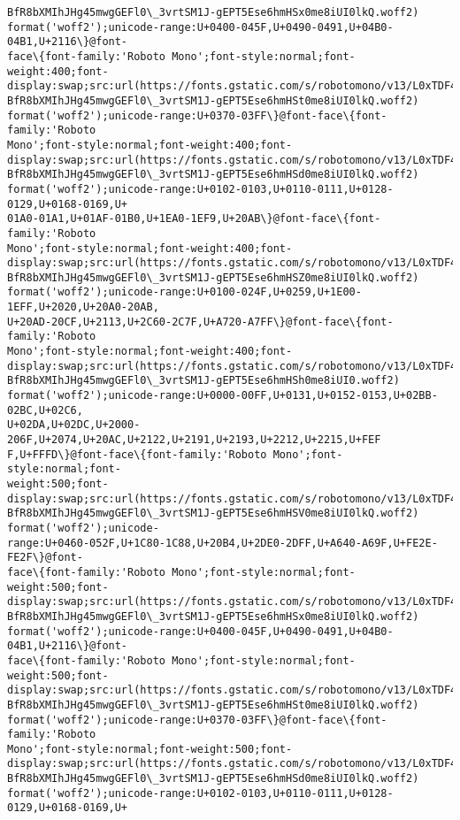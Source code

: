 \documentclass[11pt]{article}
\begin{document}
\begin{Verbatim}[commandchars=\\\{\}]
BfR8bXMIhJHg45mwgGEFl0\_3vrtSM1J-gEPT5Ese6hmHSx0me8iUI0lkQ.woff2)
format('woff2');unicode-range:U+0400-045F,U+0490-0491,U+04B0-04B1,U+2116\}@font-
face\{font-family:'Roboto Mono';font-style:normal;font-weight:400;font-
display:swap;src:url(https://fonts.gstatic.com/s/robotomono/v13/L0xTDF4xlVMF-
BfR8bXMIhJHg45mwgGEFl0\_3vrtSM1J-gEPT5Ese6hmHSt0me8iUI0lkQ.woff2)
format('woff2');unicode-range:U+0370-03FF\}@font-face\{font-family:'Roboto
Mono';font-style:normal;font-weight:400;font-
display:swap;src:url(https://fonts.gstatic.com/s/robotomono/v13/L0xTDF4xlVMF-
BfR8bXMIhJHg45mwgGEFl0\_3vrtSM1J-gEPT5Ese6hmHSd0me8iUI0lkQ.woff2)
format('woff2');unicode-range:U+0102-0103,U+0110-0111,U+0128-0129,U+0168-0169,U+
01A0-01A1,U+01AF-01B0,U+1EA0-1EF9,U+20AB\}@font-face\{font-family:'Roboto
Mono';font-style:normal;font-weight:400;font-
display:swap;src:url(https://fonts.gstatic.com/s/robotomono/v13/L0xTDF4xlVMF-
BfR8bXMIhJHg45mwgGEFl0\_3vrtSM1J-gEPT5Ese6hmHSZ0me8iUI0lkQ.woff2)
format('woff2');unicode-range:U+0100-024F,U+0259,U+1E00-1EFF,U+2020,U+20A0-20AB,
U+20AD-20CF,U+2113,U+2C60-2C7F,U+A720-A7FF\}@font-face\{font-family:'Roboto
Mono';font-style:normal;font-weight:400;font-
display:swap;src:url(https://fonts.gstatic.com/s/robotomono/v13/L0xTDF4xlVMF-
BfR8bXMIhJHg45mwgGEFl0\_3vrtSM1J-gEPT5Ese6hmHSh0me8iUI0.woff2)
format('woff2');unicode-range:U+0000-00FF,U+0131,U+0152-0153,U+02BB-02BC,U+02C6,
U+02DA,U+02DC,U+2000-206F,U+2074,U+20AC,U+2122,U+2191,U+2193,U+2212,U+2215,U+FEF
F,U+FFFD\}@font-face\{font-family:'Roboto Mono';font-style:normal;font-
weight:500;font-
display:swap;src:url(https://fonts.gstatic.com/s/robotomono/v13/L0xTDF4xlVMF-
BfR8bXMIhJHg45mwgGEFl0\_3vrtSM1J-gEPT5Ese6hmHSV0me8iUI0lkQ.woff2)
format('woff2');unicode-
range:U+0460-052F,U+1C80-1C88,U+20B4,U+2DE0-2DFF,U+A640-A69F,U+FE2E-FE2F\}@font-
face\{font-family:'Roboto Mono';font-style:normal;font-weight:500;font-
display:swap;src:url(https://fonts.gstatic.com/s/robotomono/v13/L0xTDF4xlVMF-
BfR8bXMIhJHg45mwgGEFl0\_3vrtSM1J-gEPT5Ese6hmHSx0me8iUI0lkQ.woff2)
format('woff2');unicode-range:U+0400-045F,U+0490-0491,U+04B0-04B1,U+2116\}@font-
face\{font-family:'Roboto Mono';font-style:normal;font-weight:500;font-
display:swap;src:url(https://fonts.gstatic.com/s/robotomono/v13/L0xTDF4xlVMF-
BfR8bXMIhJHg45mwgGEFl0\_3vrtSM1J-gEPT5Ese6hmHSt0me8iUI0lkQ.woff2)
format('woff2');unicode-range:U+0370-03FF\}@font-face\{font-family:'Roboto
Mono';font-style:normal;font-weight:500;font-
display:swap;src:url(https://fonts.gstatic.com/s/robotomono/v13/L0xTDF4xlVMF-
BfR8bXMIhJHg45mwgGEFl0\_3vrtSM1J-gEPT5Ese6hmHSd0me8iUI0lkQ.woff2)
format('woff2');unicode-range:U+0102-0103,U+0110-0111,U+0128-0129,U+0168-0169,U+

\end{Verbatim}
\end{document}
